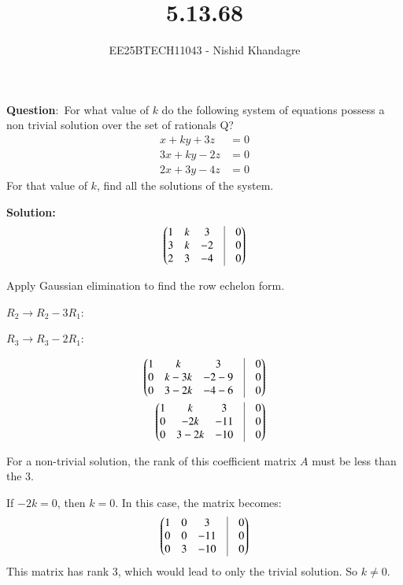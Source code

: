 \documentclass[journal]{IEEEtran}
\title{5.13.68}
\author{EE25BTECH11043 - Nishid Khandagre} %
\begin{document}
\maketitle

\renewcommand{\thefigure}{\theenumi}
\renewcommand{\thetable}{\theenumi}


\textbf{Question}:\
For what value of $k$ do the following system of equations possess a non trivial solution over the set of rationals Q?
\begin{align*}
x + ky + 3z &= 0 \\
3x + ky - 2z &= 0 \\
2x + 3y - 4z &= 0
\end{align*}
For that value of $k$, find all the solutions of the system. 

\textbf{Solution: }
\begin{align}
\myvec{
1 & k & 3 & \vrule & 0 \\
3 & k & -2 & \vrule & 0 \\
2 & 3 & -4 & \vrule & 0
}
\end{align}

Apply Gaussian elimination to find the row echelon form.


$R_2 \rightarrow R_2 - 3R_1$:

$R_3 \rightarrow R_3 - 2R_1$:

\begin{align}
\myvec{
1 & k & 3 & \vrule & 0 \\
0 & k - 3k & -2 - 9 & \vrule & 0 \\
0 & 3 - 2k & -4 - 6 & \vrule & 0
}\\
\myvec{
1 & k & 3 & \vrule & 0 \\
0 & -2k & -11 & \vrule & 0 \\
0 & 3 - 2k & -10 & \vrule & 0
}
\end{align}

For a non-trivial solution, the rank of this coefficient matrix $A$ must be less than the 3.


If $-2k = 0$, then $k=0$. In this case, the matrix becomes:
\begin{align}
\myvec{
1 & 0 & 3 & \vrule & 0 \\
0 & 0 & -11 & \vrule & 0 \\
0 & 3 & -10 & \vrule & 0
}
\end{align}
This matrix has rank 3, which would lead to only the trivial solution. So $k \neq 0$.\\
\end{document}
